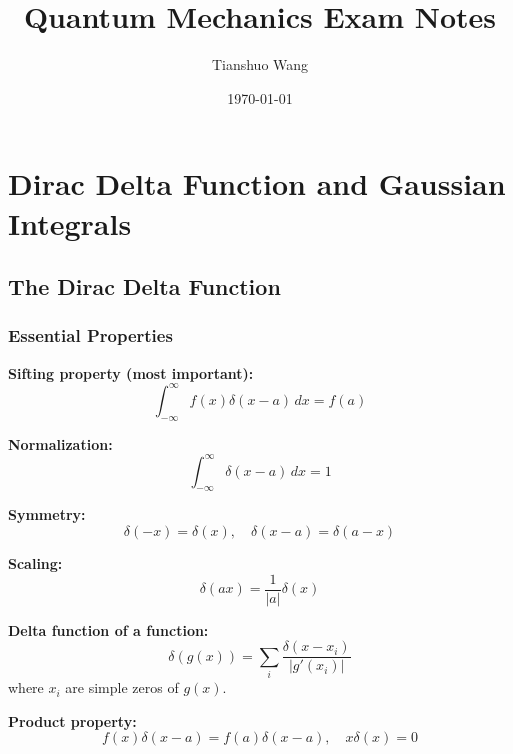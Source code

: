 \documentclass[11pt,a4paper]{article}
\title{Quantum Mechanics Exam Notes}
\author{Tianshuo Wang}
\date{\today}
\begin{document}
\maketitle
\tableofcontents
\newpage


\newpage
\section{Dirac Delta Function and Gaussian Integrals}

\subsection{The Dirac Delta Function}

\subsubsection{Essential Properties}

\textbf{Sifting property (most important):}
\begin{equation}
\boxed{\int_{-\infty}^{\infty} f(x)\delta(x - a)\, dx = f(a)}
\tag{D.1}
\end{equation}

\textbf{Normalization:}
\begin{equation}
\int_{-\infty}^{\infty} \delta(x - a)\, dx = 1
\tag{D.2}
\end{equation}

\textbf{Symmetry:}
\begin{equation}
\delta(-x) = \delta(x), \quad \delta(x - a) = \delta(a - x)
\tag{D.3}
\end{equation}

\textbf{Scaling:}
\begin{equation}
\boxed{\delta(ax) = \frac{1}{|a|}\delta(x)}
\tag{D.4}
\end{equation}

\textbf{Delta function of a function:}
\begin{equation}
\boxed{\delta(g(x)) = \sum_{i}\frac{\delta(x - x_i)}{|g'(x_i)|}}
\tag{D.5}
\end{equation}
where $x_i$ are simple zeros of $g(x)$.

\textbf{Product property:}
\begin{equation}
f(x)\delta(x - a) = f(a)\delta(x - a), \quad x\delta(x) = 0
\tag{D.6}
\end{equation}
\end{document}
